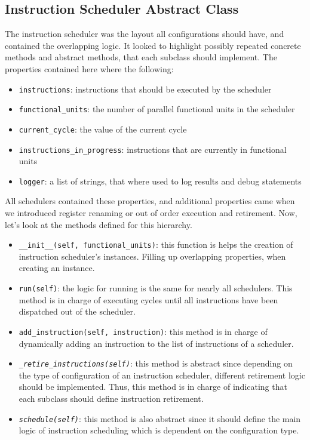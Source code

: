 \documentclass{article}
\begin{document}
\subsection{Instruction Scheduler Abstract Class}
The instruction scheduler was the layout all configurations should have, and contained the overlapping logic. It looked to highlight possibly repeated concrete methods and abstract methods, that each subclass should implement. The properties contained here where the following:
\begin{itemize}
    \item \lstinline|instructions|: instructions that should be executed by the scheduler
    \item \lstinline|functional_units|: the number of parallel functional units in the scheduler
    \item \lstinline|current_cycle|: the value of the current cycle
    \item \lstinline|instructions_in_progress|: instructions that are currently in functional units
    \item \lstinline|logger|: a list of strings, that where used to log results and debug statements
\end{itemize}

All schedulers contained these properties, and additional properties came when we introduced register renaming or out of order execution and retirement. Now, let's look at the methods defined for this hierarchy. 
\begin{itemize}
    \item \lstinline|__init__(self, functional_units)|: this function is helps the creation of instruction scheduler's instances. Filling up overlapping properties, when creating an instance.
    \item \lstinline|run(self)|: the logic for running is the same for nearly all schedulers. This method is in charge of executing cycles until all instructions have been dispatched out of the scheduler. 
    \item \lstinline|add_instruction(self, instruction)|: this method is in charge of dynamically adding an instruction to the list of instructions of a scheduler.
    \item \textit{\lstinline|_retire_instructions(self)|}: this method is abstract since depending on the type of configuration of an instruction scheduler, different retirement logic should be implemented. Thus, this method is in charge of indicating that each subclass should define instruction retirement.
    \item \textit{\lstinline|schedule(self)|}: this method is also abstract since it should define the main logic of instruction scheduling which is dependent on the configuration type.
\end{itemize}
\end{document}

